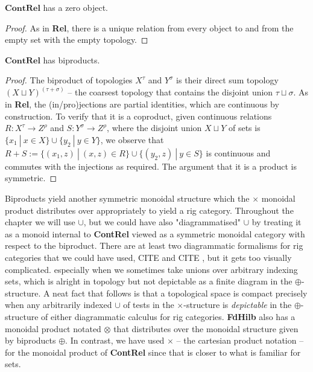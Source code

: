 \begin{proposition}
$\mathbf{ContRel}$ has a zero object.
\begin{proof}
As in \textbf{Rel}, there is a unique relation from every object to and from the empty set with the empty topology.
\end{proof}
\end{proposition}

\begin{proposition}
$\mathbf{ContRel}$ has biproducts.
\begin{proof}
The biproduct of topologies $X^\tau$ and $Y^\sigma$ is their direct sum topology $(X \sqcup Y)^{(\tau + \sigma)}$ -- the coarsest topology that contains the disjoint union $\tau \sqcup \sigma$. As in \textbf{Rel}, the (in/pro)jections are partial identities, which are continuous by construction. To verify that it is a coproduct, given continuous relations $R: X^\tau \rightarrow Z^\rho$ and $S: Y^\sigma \rightarrow Z^\rho$, where the disjoint union $X \sqcup Y$ of sets is $\{x_1 \ | \ x \in X\} \cup \{y_2 \ | \ y \in Y\}$, we observe that $R + S := \{ (x_1,z) \ | \ (x,z) \in R \} \cup \{ (y_2,z) \ | \ y \in S \}$ is continuous and commutes with the injections as required. The argument that it is a product is symmetric.
\end{proof}
\end{proposition}

\begin{remark}
Biproducts yield another symmetric monoidal structure which the $\times$ monoidal product distributes over appropriately to yield a rig category. Throughout the chapter we will use $\cup$, but we could have also "diagrammatised" $\cup$ by treating it as a monoid internal to \textbf{ContRel} viewed as a symmetric monoidal category with respect to the biproduct. There are at least two diagrammatic formalisms for rig categories that we could have used, \bR CITE \e and \bR CITE \e, but it gets too visually complicated. especially when we sometimes take unions over arbitrary indexing sets, which is alright in topology but not depictable as a finite diagram in the $\oplus$-structure. A neat fact that follows is that a topological space is compact precisely when any arbitrarily indexed $\cup$ of tests in the $\times$-structure is \emph{depictable} in the $\oplus$-structure of either diagrammatic calculus for rig categories. \textbf{FdHilb} also has a monoidal product notated $\otimes$ that distributes over the monoidal structure given by biproducts $\oplus$. In contrast, we have used $\times$ -- the cartesian product notation -- for the monoidal product of \textbf{ContRel} since that is closer to what is familiar for sets.
\end{remark}

